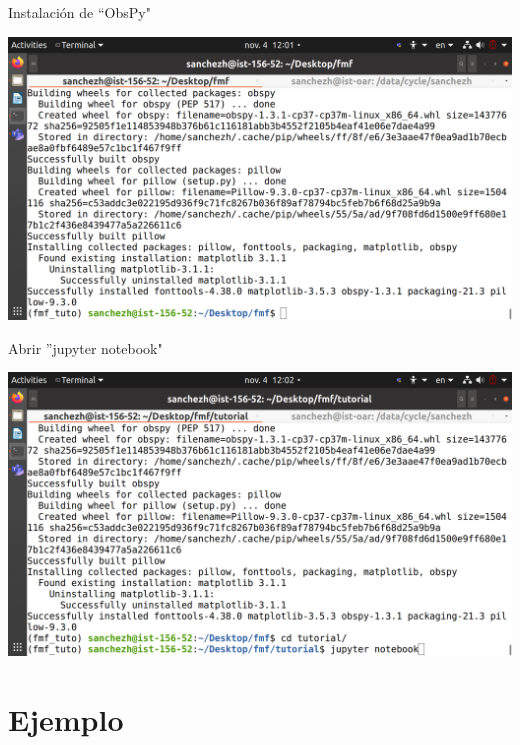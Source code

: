 \documentclass{beamer}
\begin{document}
\begin{frame}
 {Instalaci\'on de ``ObsPy"}
 
 \centering
 \includegraphics[width=1\linewidth]{images/succes_install_obspy.png}
 
\end{frame}


\begin{frame}
 {Abrir ''jupyter notebook"}

 \centering
 \includegraphics[width=1\linewidth]{images/jupyter_notebook.png}
 
\end{frame}



\section{Ejemplo}
\end{document}
